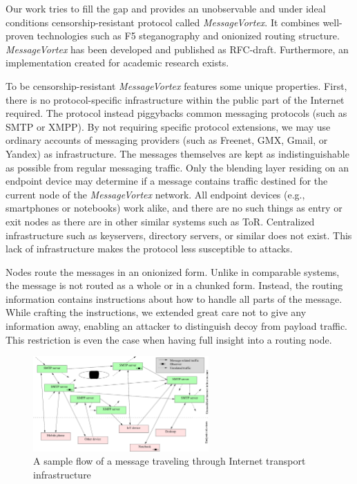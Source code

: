 \documentclass[acmsmall, screen]{acmart}
\begin{document}
Our work tries to fill the gap and provides an unobservable and under ideal conditions censorship-resistant protocol called \emph{MessageVortex}. It combines well-proven technologies such as F5 steganography and onionized routing structure. \emph{MessageVortex} has been developed and published as RFC-draft. Furthermore, an implementation created for academic research exists. 

To be censorship-resistant \emph{MessageVortex} features some unique properties. First, there is no protocol-specific infrastructure within the public part of the Internet required. The protocol instead piggybacks common messaging protocols (such as SMTP or XMPP). By not requiring specific protocol extensions, we may use ordinary accounts of messaging providers (such as Freenet, GMX, Gmail, or Yandex) as infrastructure. The messages themselves are kept as indistinguishable as possible from regular messaging traffic. Only the blending layer residing on an endpoint device may determine if a message contains traffic destined for the current node of the \emph{MessageVortex} network. All endpoint devices (e.g., smartphones or notebooks) work alike, and there are no such things as entry or exit nodes as there are in other similar systems such as ToR\cite{tor-spec}. Centralized infrastructure such as keyservers, directory servers, or similar does not exist. This lack of infrastructure makes the protocol less susceptible to attacks.

Nodes route the messages in an onionized form. Unlike in comparable systems, the message is not routed as a whole or in a chunked form. Instead, the routing information contains instructions about how to handle all parts of the message. While crafting the instructions, we extended great care not to give any information away, enabling an attacker to distinguish decoy from payload traffic. This restriction is even the case when having full insight into a routing node.

\begin{figure}[ht]
	\centering\includegraphics[width=0.6\textwidth]{../../inc/internet_overview}
	\caption{A sample flow of a message traveling through Internet transport infrastructure}
	\label{fig:inet_overview}
\end{figure}
\end{document}
